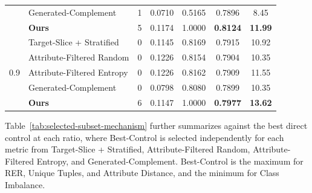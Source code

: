 \begin{table}[t]
{\begin{tabular}{c l c c c c c}
& Generated-Complement & 1 & 0.0710 & 0.5165 & 0.7896 & 8.45 \\
& \textbf{Ours} & 5 & 0.1174 & 1.0000 & \textbf{0.8124} & \textbf{11.99} \\
\midrule
\multirow{5}{*}{0.9}
& Target-Slice + Stratified & 0 & 0.1145 & 0.8169 & 0.7915 & 10.92 \\
& Attribute-Filtered Random & 0 & 0.1226 & 0.8154 & 0.7904 & 10.35 \\
& Attribute-Filtered Entropy & 0 & 0.1226 & 0.8162 & 0.7909 & 11.55 \\
& Generated-Complement & 0 & 0.0798 & 0.8080 & 0.7899 & 10.35 \\
& \textbf{Ours} & 6 & 0.1147 & 1.0000 & \textbf{0.7977} & \textbf{13.62} \\
\bottomrule
\end{tabular}%
}
\end{table}

Table~\ref{tab:selected-subset-mechanism} further summarizes \model against the best direct control at each ratio, where Best-Control is selected independently for each metric from Target-Slice + Stratified, Attribute-Filtered Random, Attribute-Filtered Entropy, and Generated-Complement. Best-Control is the maximum for RER, Unique Tuples, and Attribute Distance, and the minimum for Class Imbalance.

